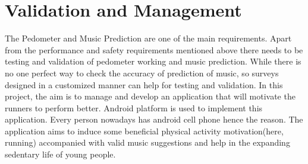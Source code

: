 \documentclass[10pt, a4paper]{article}
\begin{document}
\section*{Validation and Management}
The Pedometer and Music Prediction are one of the main requirements. Apart from the performance and safety requirements mentioned above there needs to be testing and validation of pedometer working and music prediction. While there is no one perfect way to check the accuracy of prediction of music, so surveys designed in a customized manner can help for testing and validation. In this project, the aim is to manage and develop an application that will motivate the runners to perform better. Android platform is used to implement this application. Every person nowadays has android cell phone hence the reason. The application aims to induce some beneficial physical activity motivation(here, running) accompanied with valid music suggestions and help in the expanding sedentary life of young people. 
\end{document}
